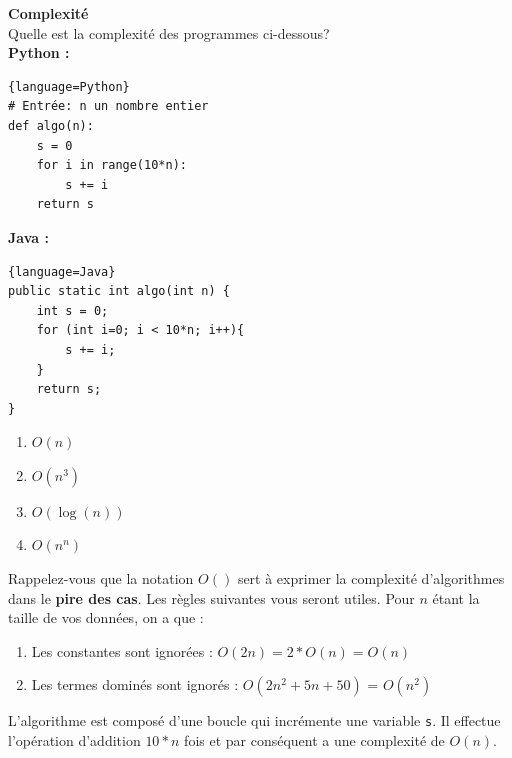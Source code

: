 \begin{Exercice}[10 minutes] \textbf{Complexité} \\

    Quelle est la complexité des programmes ci-dessous?\\
    \textbf{Python :}
    \begin{lstlisting}{language=Python}
# Entrée: n un nombre entier
def algo(n):
    s = 0
    for i in range(10*n):
        s += i
    return s \end{lstlisting}
    
    \textbf{Java :}
    \begin{lstlisting}{language=Java}
public static int algo(int n) {
    int s = 0;
    for (int i=0; i < 10*n; i++){
        s += i;
    }
    return s;
}  \end{lstlisting}

    \begin{enumerate}
        \item $O(n)$
        \item $O(n^3)$
        \item $O(\log(n))$
        \item $O(n^n)$
    \end{enumerate}
    
    \begin{conseil}
    Rappelez-vous que la notation $O()$ sert à exprimer la complexité d'algorithmes dans le \textbf{pire des cas}. Les règles suivantes vous seront utiles. Pour $n$ étant la taille de vos données, on a que :
    \begin{enumerate}
        \item Les constantes sont ignorées : $O(2n) = 2*O(n) = O(n)$ 
        \item Les termes dominés sont ignorés : $O(2n^2+5n+50)$ = $O(n^2)$
    \end{enumerate}
    \end{conseil}

    \begin{solution}
        L'algorithme est composé d'une boucle qui incrémente une variable \lstinline{s}. Il effectue l'opération d'addition $10*n$ fois et par conséquent a une complexité de $O(n)$.
    \end{solution}
\end{Exercice}



